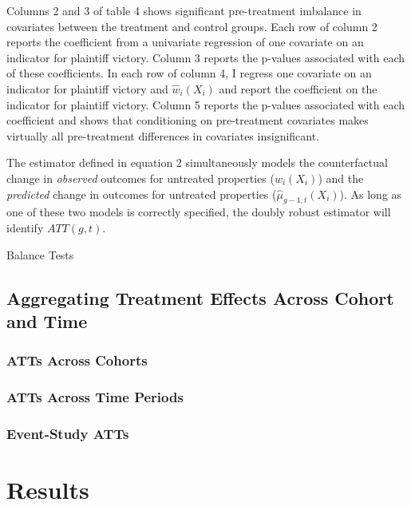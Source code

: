 \documentclass[12pt]{article}
\begin{document}
    Columns 2 and 3 of table 4 shows significant pre-treatment imbalance in covariates between the treatment and control groups. Each row of column 2 reports the coefficient from a univariate regression of one covariate on an indicator for plaintiff victory. Column 3 reports the p-values associated with each of these coefficients. In each row of column 4, I regress one covariate on an indicator for plaintiff victory and $\hat{w}_i(X_i)$ and report the coefficient on the indicator for plaintiff victory. Column 5 reports the p-values associated with each coefficient and shows that conditioning on pre-treatment covariates makes virtually all pre-treatment differences in covariates insignificant.

    The estimator defined in equation 2 simultaneously models the counterfactual change in \emph{observed} outcomes for untreated properties ($\hat{w}_i(X_i)$) and the \emph{predicted} change in outcomes for untreated properties ($\hat{\mu}_{g-1, t}(X_i)$). As long as one of these two models is correctly specified, the doubly robust estimator will identify $ATT(g, t)$.

    \newpage
    \begin{landscape}
       \begin{table}[H]
        \centering
        
        \caption{Balance Tests}
        \label{tab:my_label}
    \end{table} 
    \end{landscape}

    \subsection{Aggregating Treatment Effects Across Cohort and Time}
        \subsubsection{ATTs Across Cohorts}
        \subsubsection{ATTs Across Time Periods}
        \subsubsection{Event-Study ATTs}
    
\section{Results} \label{sec:result}
\end{document}
